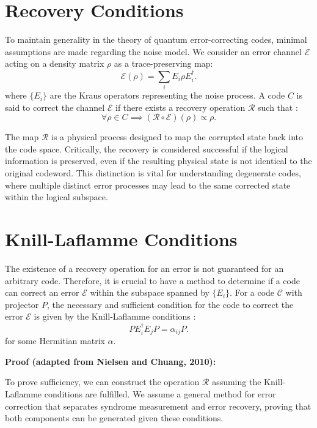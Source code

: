 \section{Recovery Conditions}

To maintain generality in the theory of quantum error-correcting codes, minimal assumptions are made regarding the noise model. We consider an error channel $\mathcal{E}$ acting on a density matrix $\rho$ as a trace-preserving map:
\begin{equation}
\mathcal{E}(\rho) = \sum_{i} E_i \rho E_i^\dagger
.\end{equation}
where $\{E_i\}$ are the Kraus operators representing the noise process. A code $C$ is said to correct the channel $\mathcal{E}$ if there exists a recovery operation $\mathcal{R}$ such that \citep{Nielsen2010}:
\begin{equation}
\forall \rho \in C \implies (\mathcal{R} \circ \mathcal{E})(\rho) \propto \rho
.\end{equation}

The map $\mathcal{R}$ is a physical process designed to map the corrupted state back into the code space. Critically, the recovery is considered successful if the logical information is preserved, even if the resulting physical state is not identical to the original codeword. This distinction is vital for understanding degenerate codes, where multiple distinct error processes may lead to the same corrected state within the logical subspace.

\section{Knill-Laflamme Conditions}

The existence of a recovery operation for an error is not guaranteed for an arbitrary code. Therefore, it is crucial to have a method to determine if a code can correct an error $\mathcal{E}$ within the subspace spanned by $\{E_i\}$. For a code $\mathcal{C}$ with projector $P$, the necessary and sufficient condition for the code to correct the error $\mathcal{E}$ is given by the Knill-Laflamme conditions \citep{Nielsen2010}:
\begin{equation}
P E^\dagger_i E_j P = \alpha_{ij} P
.\end{equation}
for some Hermitian matrix $\alpha$.

\textbf{Proof (adapted from Nielsen and Chuang, 2010):}

To prove sufficiency, we can construct the operation $\mathcal{R}$ assuming the Knill-Laflamme conditions are fulfilled. We assume a general method for error correction that separates syndrome measurement and error recovery, proving that both components can be generated given these conditions.

